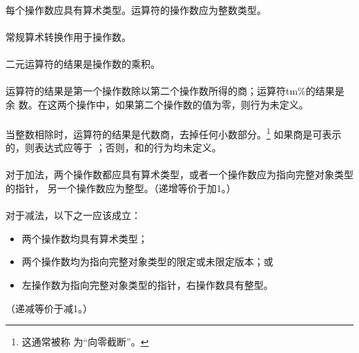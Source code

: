 \constraint
\paragraph{}
每个操作数应具有算术类型。\tm{\%}运算符的操作数应为整数类型。

\semantic
\paragraph{}
常规算术转换作用于操作数。

\paragraph{}
二元\tm{*}运算符的结果是操作数的乘积。

\paragraph{}
运算符\tm{/}的结果是第一个操作数除以第二个操作数所得的商；运算符tm{\%}的结果是余
数。在这两个操作中，如果第二个操作数的值为零，则行为未定义。

\paragraph{}
当整数相除时，\tm{/}运算符的结果是代数商，去掉任何小数部分。\footnote{这通常被称
为``向零截断''。} 如果商是可表示的，则表达式应等于
；否则，和的行为均未定义。

\syntax
\paragraph{}

\constraint
\paragraph{}
对于加法，两个操作数都应具有算术类型，或者一个操作数应为指向完整对象类型的指针，
另一个操作数应为整型。（递增等价于加1。）

\paragraph{}
对于减法，以下之一应该成立：
\begin{itemize}
  \item{两个操作数均具有算术类型；}
  \item{两个操作数均为指向完整对象类型的限定或未限定版本；或}
  \item{左操作数为指向完整对象类型的指针，右操作数具有整型。}
\end{itemize}
（递减等价于减1。）

